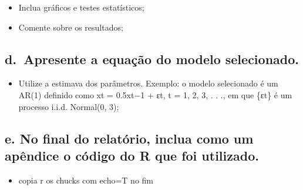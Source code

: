 \documentclass[
  letterpaper,
  DIV=11,
  numbers=noendperiod]{scrartcl}
\providecommand{\tightlist}{%
  \setlength{\itemsep}{0pt}\setlength{\parskip}{0pt}}\usepackage{longtable,booktabs,array}
\begin{document}
\begin{itemize}
\tightlist
\item
  Inclua gráficos e testes estatísticos;
\item
  Comente sobre os resultados;
\end{itemize}

\hypertarget{d.-apresente-a-equauxe7uxe3o-do-modelo-selecionado.}{%
\subsection{d.~Apresente a equação do modelo
selecionado.}\label{d.-apresente-a-equauxe7uxe3o-do-modelo-selecionado.}}

\begin{itemize}
\tightlist
\item
  Utilize a estimava dos parâmetros. Exemplo: o modelo selecionado é um
  AR(1) definido como xt = 0.5xt−1 + εt, t = 1, 2, 3, . . ., em que
  \{εt\} é um processo i.i.d. Normal(0, 3);
\end{itemize}

\hypertarget{e.-no-final-do-relatuxf3rio-inclua-como-um-apuxeandice-o-cuxf3digo-do-r-que-foi-utilizado.}{%
\subsection{e. No final do relatório, inclua como um apêndice o código
do R que foi
utilizado.}\label{e.-no-final-do-relatuxf3rio-inclua-como-um-apuxeandice-o-cuxf3digo-do-r-que-foi-utilizado.}}

\begin{itemize}
\tightlist
\item
  copia r os chucks com echo=T no fim
\end{itemize}
\end{document}
